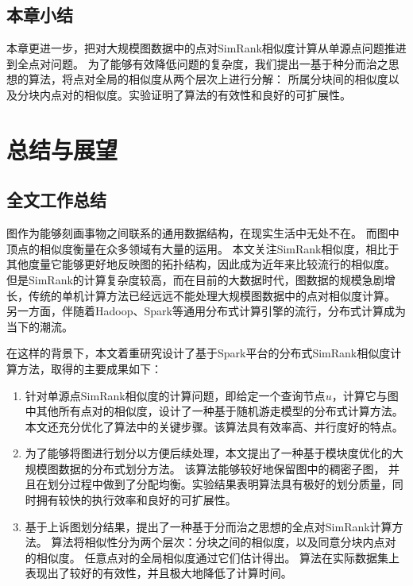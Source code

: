 \documentclass[master]{njuthesis}
\begin{document}
\section{本章小结}
本章更进一步，把对大规模图数据中的点对SimRank相似度计算从单源点问题推进到全点对问题。
为了能够有效降低问题的复杂度，我们提出一基于种分而治之思想的算法，将点对全局的相似度从两个层次上进行分解：
所属分块间的相似度以及分块内点对的相似度。实验证明了算法的有效性和良好的可扩展性。
\chapter{总结与展望}\label{chapter_concludes}
\section{全文工作总结}
图作为能够刻画事物之间联系的通用数据结构，在现实生活中无处不在。
而图中顶点的相似度衡量在众多领域有大量的运用。
本文关注SimRank相似度，相比于其他度量它能够更好地反映图的拓扑结构，因此成为近年来比较流行的相似度。
但是SimRank的计算复杂度较高，而在目前的大数据时代，图数据的规模急剧增长，传统的单机计算方法已经远远不能处理大规模图数据中的点对相似度计算。
另一方面，伴随着Hadoop、Spark等通用分布式计算引擎的流行，分布式计算成为当下的潮流。

在这样的背景下，本文着重研究设计了基于Spark平台的分布式SimRank相似度计算方法，取得的主要成果如下：
\begin{enumerate}
 \item 针对单源点SimRank相似度的计算问题，即给定一个查询节点$u$，计算它与图中其他所有点对的相似度，设计了一种基于随机游走模型的分布式计算方法。
 本文还充分优化了算法中的关键步骤。该算法具有效率高、并行度好的特点。
 \item 为了能够将图进行划分以方便后续处理，本文提出了一种基于模块度优化的大规模图数据的分布式划分方法。 该算法能够较好地保留图中的稠密子图，
 并且在划分过程中做到了分配均衡。实验结果表明算法具有极好的划分质量，同时拥有较快的执行效率和良好的可扩展性。
 \item 基于上诉图划分结果，提出了一种基于分而治之思想的全点对SimRank计算方法。 算法将相似性分为两个层次：分块之间的相似度，以及同意分块内点对的相似度。
 任意点对的全局相似度通过它们估计得出。 算法在实际数据集上表现出了较好的有效性，并且极大地降低了计算时间。
\end{enumerate}
\end{document}
